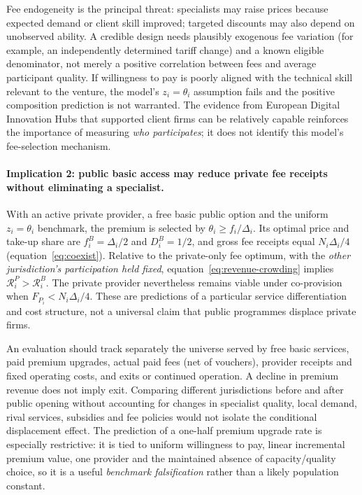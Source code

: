 \documentclass[11pt]{article}
\begin{document}
Fee endogeneity is the principal threat: specialists may raise prices because expected demand or client skill improved; targeted discounts may also depend on unobserved ability. A credible design needs plausibly exogenous fee variation (for example, an independently determined tariff change) and a known eligible denominator, not merely a positive correlation between fees and average participant quality. If willingness to pay is poorly aligned with the technical skill relevant to the venture, the model's $z_i=\theta_i$ assumption fails and the positive composition prediction is not warranted. The evidence from European Digital Innovation Hubs that supported client firms can be relatively capable \citep{CarpentierDAddaNepelski2026} reinforces the importance of measuring \emph{who participates}; it does not identify this model's fee-selection mechanism.

\paragraph{Implication 2: public basic access may reduce private fee receipts without eliminating a specialist.}
With an active private provider, a free basic public option and the uniform $z_i=\theta_i$ benchmark, the premium is selected by $\theta_i\geq f_i/\Delta_i$. Its optimal price and take-up share are $f_i^B=\Delta_i/2$ and $D_i^B=1/2$, and gross fee receipts equal $N_i\Delta_i/4$ (equation~\eqref{eq:coexist}). Relative to the private-only fee optimum, with the \emph{other jurisdiction's participation held fixed}, equation~\eqref{eq:revenue-crowding} implies $\mathcal R_i^P>\mathcal R_i^B$. The private provider nevertheless remains viable under co-provision when $F_{P_i}<N_i\Delta_i/4$. These are predictions of a particular service differentiation and cost structure, not a universal claim that public programmes displace private firms.

An evaluation should track separately the universe served by free basic services, paid premium upgrades, actual paid fees (net of vouchers), provider receipts and fixed operating costs, and exits or continued operation. A decline in premium revenue does not imply exit. Comparing different jurisdictions before and after public opening without accounting for changes in specialist quality, local demand, rival services, subsidies and fee policies would not isolate the conditional displacement effect. The prediction of a one-half premium upgrade rate is especially restrictive: it is tied to uniform willingness to pay, linear incremental premium value, one provider and the maintained absence of capacity/quality choice, so it is a useful \emph{benchmark falsification} rather than a likely population constant.
\end{document}
